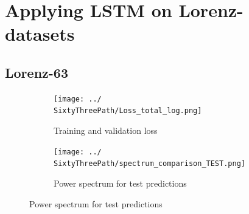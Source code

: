 \section{Applying LSTM on Lorenz-datasets} \label{sec3}
	\subsection{Lorenz-63}
	\newcommand{\SixtyThreePath}{Results/Lorenz-63/Figures/RNN-lstm-RDIM_3-N_used_50000-NUM-LAY_1-SIZE-LAY_100-ACT_tanh-ISH_statefull-SL_8-PL_4-LR_0.0001-DKP_1.0-ZKP_1.0-HSPL_300-IPL_200-NL_1-WID_0}
	\newcommand{\SixtyThreePathIndexOne}{33278}
	\newcommand{\SixtyThreePathIndexTwo}{45336}
	
	\begin{figure}[h]
		\centering
		\begin{subfigure}[b]{0.45\textwidth}
			\texttt{[image: ../\\SixtyThreePath/Loss\_total\_log.png]}
			\caption{Training and validation loss}
			\label{63:loss}
		\end{subfigure}
		\begin{subfigure}[b]{0.45\textwidth}
			\texttt{[image: ../\\SixtyThreePath/spectrum\_comparison\_TEST.png]}
			\caption{Power spectrum for test predictions}
			\label{63:spectrum}
		\end{subfigure}
	\end{figure}
	
